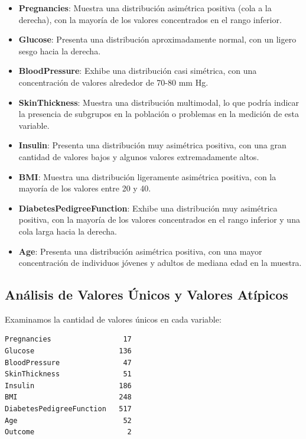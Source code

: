\documentclass[conference]{IEEEtran}
\begin{document}
\begin{itemize}
    \item \textbf{Pregnancies}: Muestra una distribución asimétrica positiva (cola a la derecha), con la mayoría de los valores concentrados en el rango inferior.
    
    \item \textbf{Glucose}: Presenta una distribución aproximadamente normal, con un ligero sesgo hacia la derecha.
    
    \item \textbf{BloodPressure}: Exhibe una distribución casi simétrica, con una concentración de valores alrededor de 70-80 mm Hg.
    
    \item \textbf{SkinThickness}: Muestra una distribución multimodal, lo que podría indicar la presencia de subgrupos en la población o problemas en la medición de esta variable.
    
    \item \textbf{Insulin}: Presenta una distribución muy asimétrica positiva, con una gran cantidad de valores bajos y algunos valores extremadamente altos.
    
    \item \textbf{BMI}: Muestra una distribución ligeramente asimétrica positiva, con la mayoría de los valores entre 20 y 40.
    
    \item \textbf{DiabetesPedigreeFunction}: Exhibe una distribución muy asimétrica positiva, con la mayoría de los valores concentrados en el rango inferior y una cola larga hacia la derecha.
    
    \item \textbf{Age}: Presenta una distribución asimétrica positiva, con una mayor concentración de individuos jóvenes y adultos de mediana edad en la muestra.
\end{itemize}

\subsection{Análisis de Valores Únicos y Valores Atípicos}

Examinamos la cantidad de valores únicos en cada variable:

\begin{lstlisting}
Pregnancies                 17
Glucose                    136
BloodPressure               47
SkinThickness               51
Insulin                    186
BMI                        248
DiabetesPedigreeFunction   517
Age                         52
Outcome                      2
\end{lstlisting}
\end{document}
